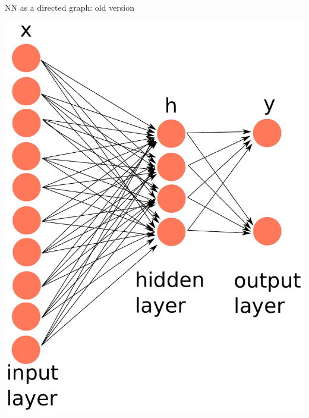 \documentclass[10pt]{beamer}
\begin{document}
\begin{frame}[fragile]{NN as a directed graph: old version}
\begin{center}
\includegraphics[scale=0.38]{images/OldNN3.pdf}
\end{center}
\end{frame}
\end{document}
